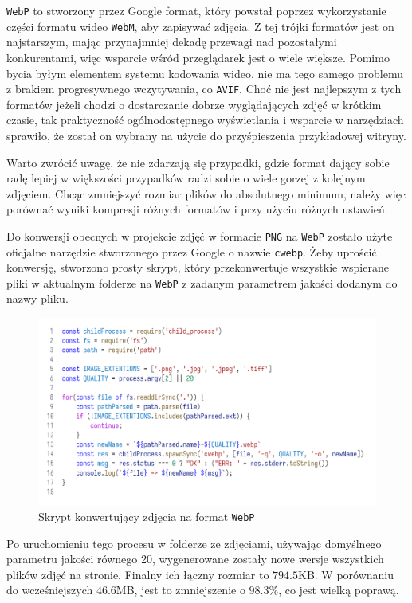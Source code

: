 \documentclass[licencjacka]{pracadypl}
\begin{document}
\texttt{WebP} to stworzony przez Google format, który powstał poprzez wykorzystanie części formatu wideo \texttt{WebM}, aby zapisywać zdjęcia. Z tej trójki formatów jest on najstarszym, mając przynajmniej dekadę przewagi nad pozostałymi konkurentami, więc wsparcie wśród przeglądarek jest o wiele większe. Pomimo bycia byłym elementem systemu kodowania wideo, nie ma tego samego problemu z brakiem progresywnego wczytywania, co \texttt{AVIF}. Choć nie jest najlepszym z tych formatów jeżeli chodzi o dostarczanie dobrze wyglądających zdjęć w krótkim czasie, tak praktyczność ogólnodostępnego wyświetlania i wsparcie w narzędziach sprawiło, że został on wybrany na użycie do przyśpieszenia przykładowej witryny.

Warto zwrócić uwagę, że nie zdarzają się przypadki, gdzie format dający sobie radę lepiej w większości przypadków radzi sobie o wiele gorzej z kolejnym zdjęciem. Chcąc zmniejszyć rozmiar plików do absolutnego minimum, należy więc porównać wyniki kompresji różnych formatów i przy użyciu różnych ustawień.

Do konwersji obecnych w projekcie zdjęć w formacie \texttt{PNG} na \texttt{WebP} zostało użyte oficjalne narzędzie stworzonego przez Google o nazwie \texttt{cwebp}. Żeby uprościć konwersję, stworzono prosty skrypt, który przekonwertuje wszystkie wspierane pliki w aktualnym folderze na \texttt{WebP} z zadanym parametrem jakości dodanym do nazwy pliku.

\begin{figure}[H]
  \includegraphics[width=\linewidth]{images/code_script_conv_webm.png}
  \caption{Skrypt konwertujący zdjęcia na format \texttt{WebP}}
  \label{fig:script-webp}
\end{figure}

Po uruchomieniu tego procesu w folderze ze zdjęciami, używając domyślnego parametru jakości równego 20, wygenerowane zostały nowe wersje wszystkich plików zdjęć na stronie. Finalny ich łączny rozmiar to $794.5$KB. W porównaniu do wcześniejszych $46.6$MB, jest to zmniejszenie o $98.3\%$, co jest wielką poprawą.
\end{document}
